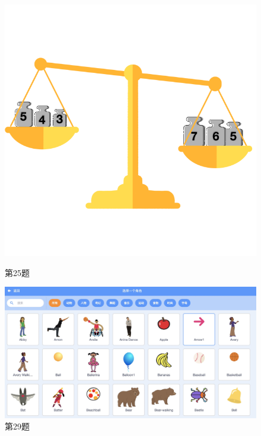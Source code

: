 \documentclass[10pt, a4paper]{article}
\begin{document}
    \begin{figure}[htbp]
        \centering
        \begin{minipage}[t]{.23\textwidth}
            \centering
            \includegraphics[width=\textwidth]{25.png}
            \caption*{第25题}
        \end{minipage}
        \begin{minipage}[t]{.33\textwidth}
            \centering
            \includegraphics[width=\textwidth]{29.jpg}
            \caption*{第29题}
        \end{minipage}
        \begin{minipage}[t]{.28\textwidth}
            \centering

\end{minipage}
\end{figure}
\end{document}
